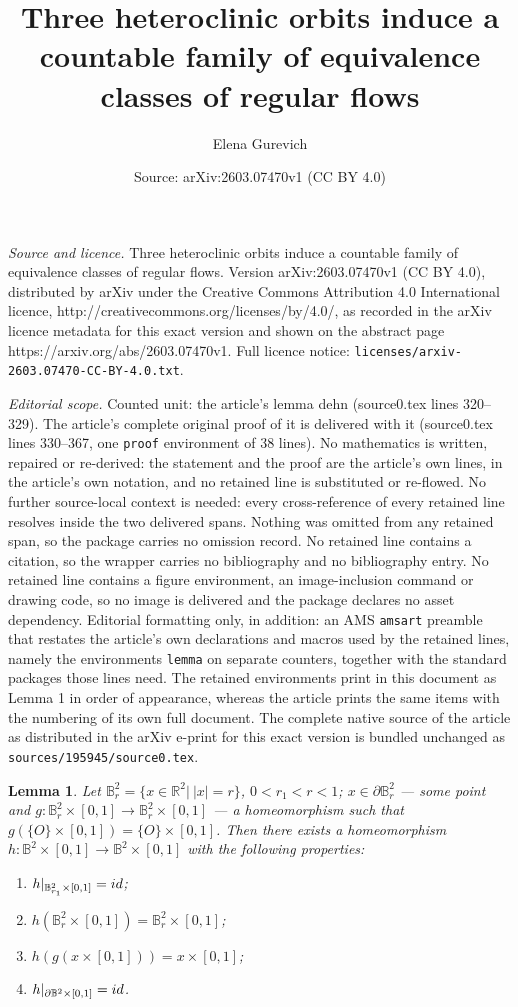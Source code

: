 \documentclass[10pt,a4paper]{amsart}
\title{Three heteroclinic orbits induce a countable family of equivalence classes of regular flows}
\author{Elena Gurevich}
\date{Source: arXiv:2603.07470v1 (CC BY 4.0)}
\newtheorem{lemma}{Lemma}
\begin{document}
\maketitle

\noindent\emph{Source and licence.} Three heteroclinic orbits induce a countable family of equivalence classes of regular flows. Version arXiv:2603.07470v1 (CC BY 4.0), distributed by arXiv under the Creative Commons Attribution 4.0 International licence, http://creativecommons.org/licenses/by/4.0/, as recorded in the arXiv licence metadata for this exact version and shown on the abstract page https://arxiv.org/abs/2603.07470v1. Full licence notice: \texttt{licenses/arxiv-2603.07470-CC-BY-4.0.txt}.\par\smallskip

\noindent\textit{Editorial scope.} Counted unit: the article's lemma dehn (source0.tex lines 320--329). The article's complete original proof of it is delivered with it (source0.tex lines 330--367, one \texttt{proof} environment of 38 lines). No mathematics is written, repaired or re-derived: the statement and the proof are the article's own lines, in the article's own notation, and no retained line is substituted or re-flowed.  No further source-local context is needed: every cross-reference of every retained line resolves inside the two delivered spans.  Nothing was omitted from any retained span, so the package carries no omission record.  No retained line contains a citation, so the wrapper carries no bibliography and no bibliography entry.  No retained line contains a figure environment, an image-inclusion command or drawing code, so no image is delivered and the package declares no asset dependency.  Editorial formatting only, in addition: an AMS \texttt{amsart} preamble that restates the article's own declarations and macros used by the retained lines, namely the environments \texttt{lemma} on separate counters, together with the standard packages those lines need.  The retained environments print in this document as Lemma 1 in order of appearance, whereas the article prints the same items with the numbering of its own full document.  The complete native source of the article as distributed in the arXiv e-print for this exact version is bundled unchanged as \texttt{sources/195945/source0.tex}.
\begin{lemma}\label{dehn}
Let $\mathbb B^2_r=\{x\in \mathbb R^2|\ |x|=r\}$, $0<r_1<r<1$; $x\in \partial \mathbb B^2_r$ --- some point and $g: \mathbb B^2_r\times [0,1]\to \mathbb B^2_r\times [0,1]$ --- a homeomorphism such that $g(\{O\}\times [0,1])=\{O\}\times [0,1]$. Then there exists a homeomorphism $h:\mathbb B^2\times [0,1]\to \mathbb B^2\times [0,1]$ with the following properties:
\begin{enumerate}
\item $h|_{\mathbb B^2_{r_1}\times [0,1]}={\rm id}$;
\item $h(\mathbb B^2_r\times [0,1])=\mathbb B^2_r\times [0,1]$;
\item $h(g(x\times [0,1]))=x\times [0,1]$;
\item $h|_{\partial \mathbb B^2\times [0,1]}={\rm id}$.
\end{enumerate}

\end{lemma}
\end{document}
